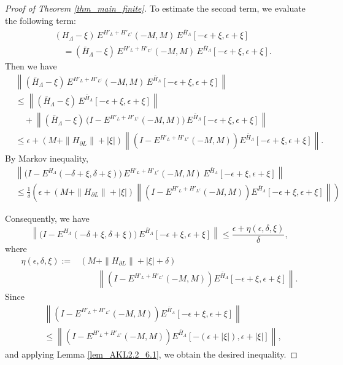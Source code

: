 \documentclass[11pt]{article}
\numberwithin{equation}{section}
\begin{document}
\begin{proof}[Proof of Theorem \ref{thm_main_finite}]
To estimate the second term, we evaluate the following term:
\begin{align*}
&(H_\Lambda-\xi)\,E^{H'_L+H'_{L^c}}(-M,M)\,
E^{\bar{H}_\Lambda}[-\epsilon+\xi,\epsilon+\xi]\\
&\quad=(\bar{H}_\Lambda-\xi)\,E^{H'_L+H'_{L^c}}(-M,M)\,
E^{\bar{H}_\Lambda}[-\epsilon+\xi,\epsilon+\xi].
\end{align*}
Then we have
\begin{align*}
&\left\|(\bar{H}_\Lambda-\xi)\, E^{H'_L+H'_{L^c}}(-M,M)\, E^{\bar{H}_\Lambda}[-\epsilon+\xi,\epsilon+\xi]\right\|\\
&\leq\left\|(\bar{H}_\Lambda-\xi)\,E^{\bar{H}_\Lambda}[-\epsilon+\xi,\epsilon+\xi]\right\|\\
&\quad+\left\|(\bar{H}_\Lambda-\xi)\,
\Big(I-E^{H'_L+H'_{L^c}}(-M,M)\Big)\,E^{\bar{H}_\Lambda}[-\epsilon+\xi,\epsilon+\xi]\right\|\\
&\leq \epsilon+(M+\|H_{\partial L}\|+|\xi|) \left\|\left(I-E^{H'_L+H'_{L^c}}(-M,M)\right)
E^{\bar{H}_\Lambda}[-\epsilon+\xi,\epsilon+\xi]\right\|.
\end{align*}
By Markov inequality,
\begin{align*}
&\left\|\Big(I-E^{H_\Lambda}(-\delta+\xi,\delta+\xi)\Big)\, E^{H'_L+H'_{L^c}}(-M,M)\, E^{\bar{H}_\Lambda}[-\epsilon+\xi,\epsilon+\xi] \right\|\\
&\leq \frac{1}{\delta} \left(\epsilon+(M+\|H_{\partial L}\|+|\xi|) \left\|\left(I-E^{H'_L+H'_{L^c}}(-M,M)\right) E^{\bar{H}_\Lambda}[-\epsilon+\xi,\epsilon+\xi] \right\|\right)
\end{align*}

Consequently, we have
\[
\left\|\Big(I-E^{H_\Lambda}(-\delta+\xi,\delta+\xi)\Big)\, E^{\bar{H}_\Lambda}[-\epsilon+\xi,\epsilon+\xi]\right\|
\leq\frac{\epsilon+\eta(\epsilon,\delta,\xi)}{\delta},
\]
where
\begin{align*}
\eta(\epsilon,\delta,\xi):=
&(M+\|H_{\partial L}\|+|\xi|+\delta)\\
&\qquad\left\|\left(I-E^{H'_L+H'_{L^c}}(-M,M)\right) E^{\bar{H}_\Lambda}[-\epsilon+\xi,\epsilon+\xi] \right\|.
\end{align*}
Since
\begin{align*}
&\left\|\left(I-E^{H'_L+H'_{L^c}}(-M,M)\right) E^{\bar{H}_\Lambda}[-\epsilon+\xi,\epsilon+\xi]\right\|\\
&\leq \left\|\left(I-E^{H'_L+H'_{L^c}}(-M,M)\right) E^{\bar{H}_\Lambda}[-(\epsilon+|\xi|),\epsilon+|\xi|] \right\|,
\end{align*}
and applying Lemma \ref{lem_AKL2.2_6.1}, we obtain the desired inequality.
\end{proof}
\end{document}

